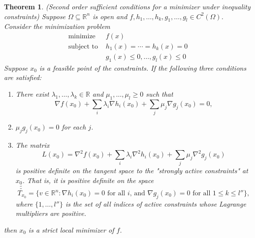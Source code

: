 \documentclass[11pt]{article}
\newcommand{\R}{\mathbb{R}}
\newtheorem{theorem}{Theorem}[subsection]
\begin{document}
\begin{theorem}
(Second order sufficient conditions for a minimizer under inequality constraints) Suppose $\Omega \subseteq \R^n$ is open and $f, h_1, \dots, h_k, g_1, \dots, g_l \in C^2(\Omega)$. Consider the minimization problem
\begin{align*}
\text{minimize } &f(x) \\
\text{subject to } &h_1(x) = \cdots = h_k(x) = 0 \\
&g_1(x) \leq 0, \dots, g_l(x) \leq 0
\end{align*}
Suppose $x_0$ is a feasible point of the constraints. If the following three conditions are satisfied:
\begin{enumerate}
\item
There exist $\lambda_1, \dots, \lambda_k \in \R$ and $\mu_1, \dots, \mu_l \geq 0$ such that
\[
\nabla f(x_0) + \sum_i \lambda_i \nabla h_i(x_0) + \sum_j \mu_j \nabla g_j(x_0) = 0,
\]

\item
$\mu_j g_j(x_0) = 0$ for each $j$.

\item
The matrix
\[
L(x_0) = \nabla^2 f(x_0) + \sum_i \lambda_i \nabla^2 h_i(x_0) + \sum_j \mu_j \nabla^2 g_j(x_0)
\]
is positive definite on the tangent space to the "strongly active constraints" at $x_0$. That is, it is positive definite on the space
\[
\tilde{\tilde{T_{x_0}}} = \{ v \in \R^n : \nabla h_i(x_0) = 0 \text{ for all $i$, and } \nabla g_j(x_0) = 0 \text{ for all $1 \leq k \leq l''$} \},
\]
where $\{1, \dots, l''\}$ is the set of all indices of active constraints whose Lagrange multipliers are positive.
\end{enumerate}
then $x_0$ is a strict local minimizer of $f$.
\end{theorem}
\end{document}
